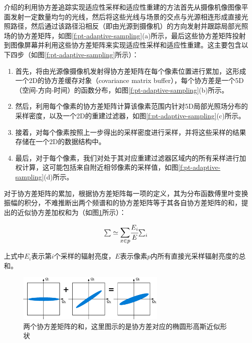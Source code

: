 \cite{a:5DCovarianceTracingforEfficientDefocusandMotionBlur}介绍的利用协方差追踪实现适应性采样和适应性重建的方法首先从摄像机像图像平面发射一定数量均匀的光线，然后将这些光线与场景的交点与光源相连形成直接光照路径，然后通过该路径沿相反（即由光源到摄像机）的方向发射并跟踪局部光照场的协方差矩阵，如图\ref{f:pt-adaptive-sampling}(a)所示，最后这些协方差矩阵投射到图像屏幕并利用这些协方差矩阵来实现适应性采样和适应性重建。这主要包含以下四步（如图\ref{f:pt-adaptive-sampling}所示）：

\begin{enumerate}
	\item 首先，将由光源像摄像机发射得协方差矩阵在每个像素位置进行累加，这形成一个2D的协方差缓存对象（covariance matrix buffer），每个协方差是一个5D（空间-方向-时间）的函数分布，如图\ref{f:pt-adaptive-sampling}(b)所示。
	\item 然后，利用每个像素的协方差矩阵计算该像素范围内针对5D局部光照场分布的采样密度，以及一个2D的重建过滤器，如图\ref{f:pt-adaptive-sampling}(c)所示。
	\item 接着，对每个像素按照上一步得出的采样密度进行采样，并将这些采样的结果存储在一个2D的数据结构中。
	\item 最后，对于每个像素，我们对处于其对应重建过滤器区域内的所有采样进行加权计算，这可能包括来自附近相邻像素的采样值，如图\ref{f:pt-adaptive-sampling}(d)所示。
\end{enumerate}

对于协方差矩阵的累加，根据协方差矩阵每一项的定义，其为分布函数傅里叶变换振幅的积分，不难推断出两个频谱和的协方差矩阵等于其各自协方差矩阵的和，\cite{a:5DCovarianceTracingforEfficientDefocusandMotionBlur}提出的近似协方差加权和为（如图\ref{f:pt-covariance-sum}所示）：

\begin{equation}
 \mathsmaller{\sum}\simeq\mathlarger{\sum_{x\in p}} \cfrac{E_i}{E} \mathsmaller{\sum\nolimits_i}
\end{equation}

\noindent 上式中$E_i$表示第$i$个采样的辐射亮度，$E$表示像素$p$内所有直接光采样辐射亮度的总和。

\begin{figure}
\sidecaption
	\includegraphics[width=0.65\textwidth]{figures/pt/covariance-sum}
	\caption{两个协方差矩阵的和，这里图示的是协方差对应的椭圆形高斯近似形状}
	\label{f:pt-covariance-sum}
\end{figure}

